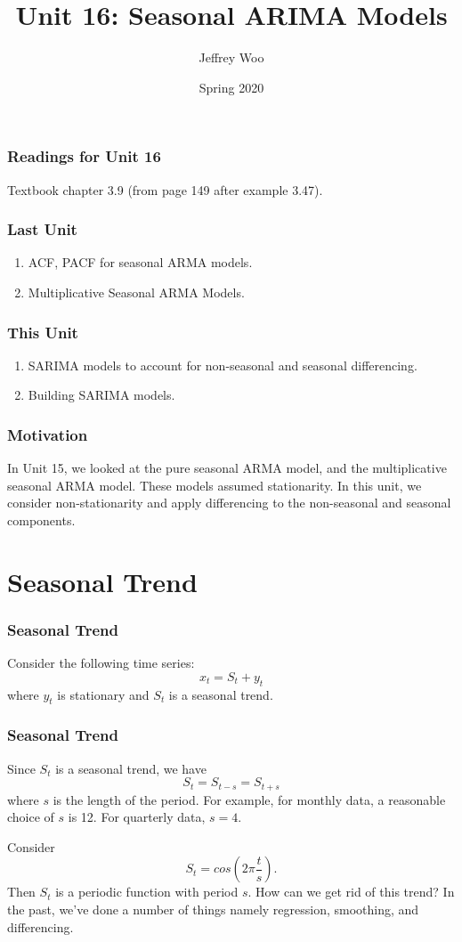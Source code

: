 \documentclass[%
xcolor=pdftex]{beamer}
\title{Unit 16: Seasonal ARIMA Models}
\author[STAT 5170: Applied Time Series, Unit 16]{Jeffrey Woo}
\institute{Department of Statistics, University of Virginia}
\date{Spring 2020}
\begin{document}
\frame{\titlepage}


\begin{frame}
\frametitle{Readings for Unit 16}

Textbook chapter 3.9 (from page 149 after example 3.47).

\end{frame}



\begin{frame}
\frametitle{Last Unit}
\begin{enumerate}
\item ACF, PACF for seasonal ARMA models.
\item Multiplicative Seasonal ARMA Models.
\end{enumerate}
\end{frame}

\begin{frame}
\frametitle{This Unit}

\begin{enumerate}
\item SARIMA models to account for non-seasonal and seasonal differencing.
\item Building SARIMA models.
\end{enumerate}


\end{frame}


\begin{frame}
\frametitle{Motivation}

In Unit 15, we looked at the pure seasonal ARMA model, and the multiplicative seasonal ARMA model. These models assumed stationarity. In this unit, we consider non-stationarity and apply differencing to the non-seasonal and seasonal components.

\end{frame}

\section{Seasonal Trend}
\frame{\tableofcontents[currentsection]}

\begin{frame}
\frametitle{Seasonal Trend}

Consider the following time series:
$$
x_t=S_t+ y_t
$$
where $y_t$ is stationary and $S_t$ is a seasonal trend.

\end{frame}

\begin{frame}
\frametitle{Seasonal Trend}
Since $S_t$ is a seasonal trend, we have
$$
S_t=S_{t-s}=S_{t+s}
$$
where $s$ is the length of the period. For example, for monthly
data, a reasonable choice of $s$ is 12. For quarterly data,
$s=4$. 

Consider
$$
S_t=cos(2 \pi \frac{t}{s}).
$$
Then $S_t$ is a periodic function with period $s$. How can we get rid of this trend?  In the past, we've done  a
number of things namely regression, smoothing, and
differencing.

\end{frame}
\end{document}
